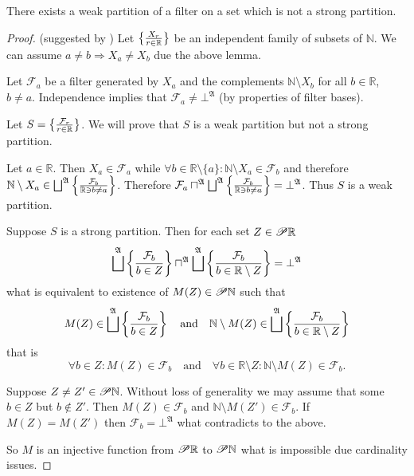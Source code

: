 \begin{example}
There exists a weak partition of a filter on a set which is not a
strong partition.\end{example}
\begin{proof}
(suggested by ) Let $\left\{ \frac{X_{r}}{r\in\mathbb{R}}\right\}$ be
an independent family of subsets of $\mathbb{N}$. We can assume $a\ne b\Rightarrow X_{a}\ne X_{b}$
due the above lemma.

Let $\mathcal{F}_{a}$ be a filter generated by $X_{a}$ and the complements
$\mathbb{N}\setminus X_{b}$ for all $b\in\mathbb{R}$, $b\ne a$.
Independence implies that $\mathcal{F}_{a}\ne\bot^{\mathfrak{A}}$
(by properties of filter bases).

Let $S=\left\{ \frac{\mathcal{F}_{r}}{r\in\mathbb{R}}\right\}$. We will prove
that $S$ is a weak partition but not a strong partition.

Let $a\in\mathbb{R}$. Then $X_{a}\in\mathcal{F}_{a}$ while $\forall b\in\mathbb{R}\setminus\{a\}:\mathbb{N}\setminus X_{a}\in\mathcal{F}_{b}$
and therefore $\mathbb{N}\setminus X_{a}\in\bigsqcup^{\mathfrak{A}}\left\{ \frac{\mathcal{F}_{b}}{\mathbb{R}\ni b\ne a}\right\}$.
Therefore $\mathcal{F}_{a}\sqcap^{\mathfrak{A}}\bigsqcup^{\mathfrak{A}}\left\{ \frac{\mathcal{F}_{b}}{\mathbb{R}\ni b\ne a}\right\}=\bot^{\mathfrak{A}}$.
Thus $S$ is a weak partition.

Suppose $S$ is a strong partition. Then for each set $Z\in\mathscr{P}\mathbb{R}$
\[
\bigsqcup^{\mathfrak{A}}\left\{ \frac{\mathcal{F}_{b}}{b\in Z}\right\}\sqcap^{\mathfrak{A}}\bigsqcup^{\mathfrak{A}}\left\{ \frac{\mathcal{F}_{b}}{b\in\mathbb{R}\setminus Z}\right\}=\bot^{\mathfrak{A}}
\]
what is equivalent to existence of $M(Z)\in\mathscr{P}\mathbb{N}$ such
that
\[
M(Z)\in\bigsqcup^{\mathfrak{A}}\left\{ \frac{\mathcal{F}_{b}}{b\in Z}\right\}\quad\text{and}\quad\mathbb{N}\setminus M(Z)\in\bigsqcup^{\mathfrak{A}}\left\{ \frac{\mathcal{F}_{b}}{b\in\mathbb{R}\setminus Z}\right\}
\]
that is
\[
\forall b\in Z:M(Z)\in\mathcal{F}_{b}\quad\text{and}\quad\forall b\in\mathbb{R}\setminus Z:\mathbb{N}\setminus M(Z)\in\mathcal{F}_{b}.
\]


Suppose $Z\ne Z'\in\mathscr{P}\mathbb{N}$. Without loss of generality
we may assume that some $b\in Z$ but $b\notin Z'$. Then $M(Z)\in\mathcal{F}_{b}$
and $\mathbb{N}\setminus M(Z')\in\mathcal{F}_{b}$. If $M(Z)=M(Z')$
then $\mathcal{F}_{b}=\bot^{\mathfrak{A}}$ what contradicts to the
above.

So $M$ is an injective function from $\mathscr{P}\mathbb{R}$ to $\mathscr{P}\mathbb{N}$
what is impossible due cardinality issues.\end{proof}
